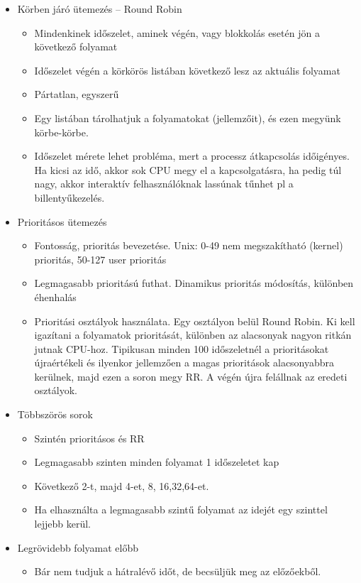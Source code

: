 \documentclass[margin=0px]{article}
\begin{document}
	\begin{itemize}
		\item Körben járó ütemezés -- Round Robin
		\begin{itemize}
			\item Mindenkinek időszelet, aminek végén, vagy blokkolás esetén jön a következő folyamat
			\item Időszelet végén a körkörös listában következő lesz az aktuális folyamat
			\item Pártatlan, egyszerű
			\item Egy listában tárolhatjuk a folyamatokat (jellemzőit), és ezen megyünk körbe-körbe.
			\item Időszelet mérete lehet probléma, mert a processz átkapcsolás időigényes. Ha kicsi az idő, akkor sok CPU megy el a kapcsolgatásra, ha pedig túl nagy, akkor interaktív felhasználóknak lassúnak tűnhet pl a billentyűkezelés.
		\end{itemize}
		\item Prioritásos ütemezés
		\begin{itemize}
			\item Fontosság, prioritás bevezetése. Unix: 0-49 nem megszakítható (kernel) prioritás, 50-127 user prioritás
			\item Legmagasabb prioritású futhat. Dinamikus prioritás módosítás, különben éhenhalás
			\item Prioritási osztályok használata. Egy osztályon belül Round Robin. Ki kell igazítani a folyamatok prioritását, különben az alacsonyak nagyon ritkán jutnak CPU-hoz. Tipikusan minden 100 időszeletnél a prioritásokat újraértékeli és ilyenkor jellemzően a magas prioritások alacsonyabbra kerülnek, majd ezen a soron megy RR. A végén újra felállnak az eredeti osztályok.
		\end{itemize}
		\item Többszörös sorok
		\begin{itemize}
			\item Szintén prioritásos és RR
			\item Legmagasabb szinten minden folyamat 1 időszeletet kap
			\item Következő 2-t, majd 4-et, 8, 16,32,64-et.
			\item Ha elhasználta a legmagasabb szintű folyamat az idejét egy szinttel lejjebb kerül.
		\end{itemize}
		\item Legrövidebb folyamat előbb
		\begin{itemize}
			\item Bár nem tudjuk a hátralévő időt, de becsüljük meg az előzőekből.

\end{itemize}
\end{itemize}
\end{document}
